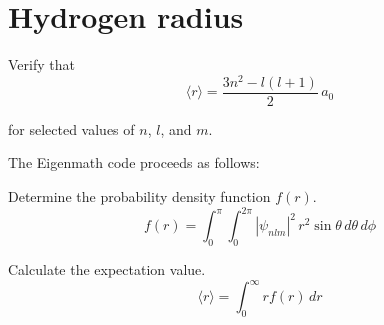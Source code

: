 

\section*{Hydrogen radius}

Verify that
\begin{equation*}
\langle r\rangle=\frac{3n^2-l(l+1)}{2}\,a_0
\tag{1}
\end{equation*}

for selected values of $n$, $l$, and $m$.

\bigskip
The Eigenmath code proceeds as follows:

\bigskip
Determine the probability density function $f(r)$.
\begin{equation*}
f(r)=\int_0^\pi\int_0^{2\pi}|\psi_{nlm}|^2\,r^2\sin\theta\,d\theta\,d\phi
\end{equation*}

Calculate the expectation value.
\begin{equation*}
\langle r\rangle=\int_0^\infty rf(r)\,dr
\end{equation*}



